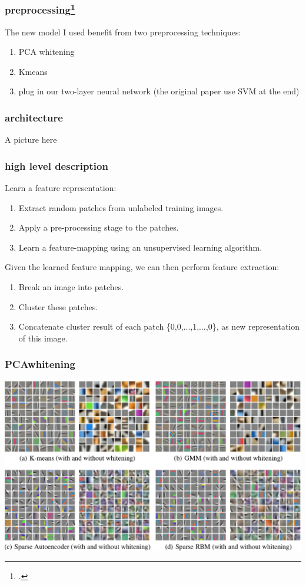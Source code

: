 \documentclass{beamer}
\begin{document}
\begin{frame}
\frametitle{preprocessing\footcite{coates2011analysis}}
The new model I used benefit from two preprocessing techniques:
\begin{enumerate}
 \item PCA whitening
 \item Kmeans
 \item plug in our two-layer neural network (the original paper use SVM at the end)
\end{enumerate}
\end{frame}
\begin{frame}
\frametitle{architecture}
A picture here
\end{frame}
\begin{frame}
\frametitle{high level description}
Learn a feature representation:
\begin{enumerate}
\item Extract random patches from unlabeled training images.
\item Apply a pre-processing stage to the patches.
\item Learn a feature-mapping using an unsupervised learning algorithm.
\end{enumerate}
Given the learned feature mapping, we can then perform feature extraction:
\begin{enumerate}
\item Break an image into patches.
\item Cluster these patches. 
\item Concatenate cluster result of each patch \{0,0,...,1,...,0\}, as new representation of this image.
\end{enumerate}
\end{frame}
\begin{frame}
\frametitle{PCAwhitening}
\includegraphics[width=\textwidth]{whiten.png}

\end{frame}
\end{document}
